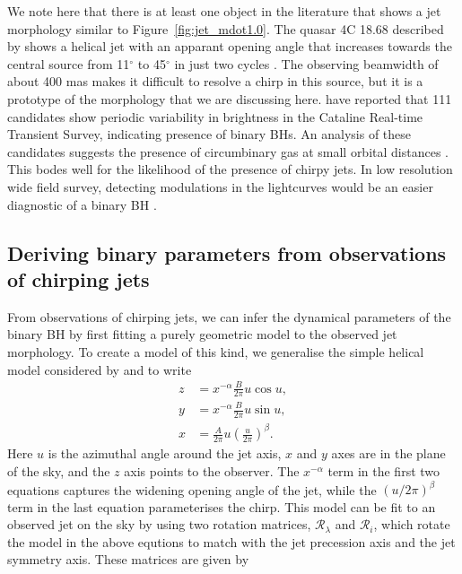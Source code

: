 \documentclass[a4paper,fleqn,usenatbib]{mnras}
\begin{document}
We note here that there is at least one object in the literature that
shows a jet morphology similar to Figure~\ref{fig:jet_mdot1.0}.  The
quasar 4C 18.68 described by \citet{1982ApJ...253L...1G} shows a
helical jet with an apparant opening angle that increases towards the
central source from 11$^\circ$ to 45$^\circ$ in just two cycles
\citet{1982ApJ...262..478G}.  The observing beamwidth of about 400 mas
makes it difficult to resolve a chirp in this source, but it is a
prototype of the morphology that we are discussing here.
\citet{2015MNRAS.453.1562G} have reported that 111 candidates show
periodic variability in brightness in the Cataline Real-time Transient
Survey, indicating presence of binary BHs.  An analysis of these
candidates suggests the presence of circumbinary gas at small orbital
distances \citep{2015MNRAS.453.1562G}.  This bodes well for the
likelihood of the presence of chirpy jets.  In low resolution wide
field survey, detecting modulations in the lightcurves would be an
easier diagnostic of a binary BH \citep{2011ApJ...743..136O,
  2011ApJ...734L..37K}.

\subsection{Deriving binary parameters from observations of chirping jets}

From observations of chirping jets, we can infer the dynamical
parameters of the binary BH by first fitting a purely geometric model
to the observed jet morphology.  To create a model of this kind, we
generalise the simple helical model considered by
\citet{2014MNRAS.445.1370K} and \citet{2001NewA....6...61N} to write
\begin{align}
  z &= x^{-\alpha} \frac{B}{2\pi} u \cos{u}, \\
  y &= x^{-\alpha} \frac{B}{2\pi} u \sin{u}, \\
  x &= \frac{A}{2\pi} u \left(\frac{u}{2\pi}\right)^\beta.
\end{align}
Here $u$ is the azimuthal angle around the jet axis, $x$ and $y$ axes
are in the plane of the sky, and the $z$ axis points to the observer.
The $x^{-\alpha}$ term in the first two equations captures the
widening opening angle of the jet, while the $(u/2\pi)^{\beta}$ term
in the last equation parameterises the chirp.  This model can be fit
to an observed jet on the sky by using two rotation matrices,
$\mathcal{R}_\lambda$ and $\mathcal{R}_i$, which rotate the model
in the above equtions to match with the jet precession axis and the
jet symmetry axis.  These matrices are given by
\end{document}
